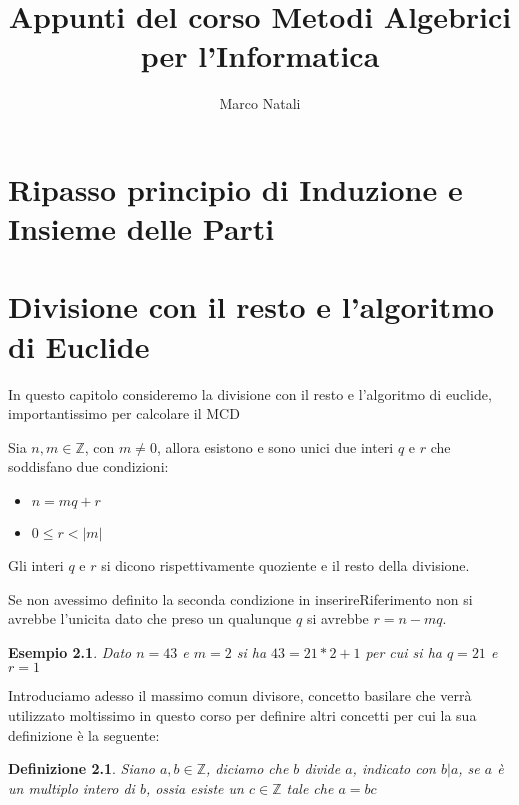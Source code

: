 \documentclass[a4paper]{report}
\newtheorem{defi}{Definizione}%
\newtheorem{esempio}{Esempio}
\newcommand{\numberset}{\mathbb}
\newcommand{\Z}{\numberset{Z}}
\begin{document}
\title{Appunti del corso Metodi Algebrici per l'Informatica}
\author{Marco Natali}
\date{}
\maketitle

\chapter{Ripasso principio di Induzione e Insieme delle Parti}



\chapter{Divisione con il resto e l'algoritmo di Euclide}
In questo capitolo consideremo la divisione con il resto e l'algoritmo di euclide, importantissimo per calcolare il MCD

\begin{thm}
  Sia $n,m \in \Z$, con $m \neq 0$, allora esistono e sono unici due interi $q$ e $r$ che soddisfano due condizioni:
  \begin{itemize}
        \item $n = mq + r$
        \item $0 \leq r < |m|$
  \end{itemize}
  Gli interi $q$ e $r$ si dicono rispettivamente quoziente e il resto della divisione.
\end{thm}



Se non avessimo definito la seconda condizione in inserireRiferimento non si avrebbe l'unicita dato che preso un qualunque $q$
si avrebbe $r = n - mq$.

\begin{esempio}
  Dato $n = 43$ e $m = 2$ si ha $43 = 21 * 2 + 1$ per cui si ha $q = 21$ e $r = 1$
\end{esempio}

Introduciamo adesso il massimo comun divisore, concetto basilare che verrà utilizzato moltissimo in questo corso per definire altri concetti
per cui la sua definizione è la seguente:
\begin{defi}
  Siano $a,b \in \Z$, diciamo che $b$ divide $a$, indicato con $b | a$, se $a$ è un multiplo intero di $b$, ossia esiste un $c \in \Z$
  tale che $a = bc$
\end{defi}

\end{document}
